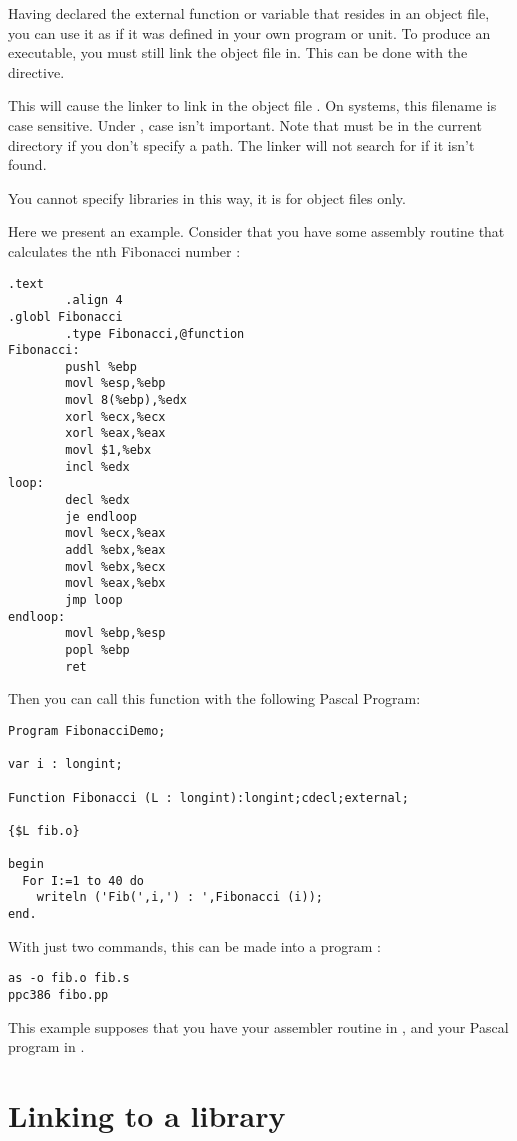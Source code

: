\documentclass{report}
\begin{document}
Having declared the external function or variable that resides in an object file,
you can use it as if it was defined in your own program or unit.
To produce an executable, you must still link the object file in.
This can be done with the  directive.

This will cause the linker to link in the object file . On
\linux systems, this filename is case sensitive. Under \dos, case isn't
important. Note that  must be in the current directory if you
don't specify a path. The linker will not search for  if it
isn't found.

You cannot specify libraries in this way, it is for object files only.

Here we present an example. Consider that you have some assembly routine that
calculates the nth Fibonacci number :
\begin{verbatim}
.text
        .align 4
.globl Fibonacci
        .type Fibonacci,@function
Fibonacci:
        pushl %ebp
        movl %esp,%ebp
        movl 8(%ebp),%edx
        xorl %ecx,%ecx
        xorl %eax,%eax
        movl $1,%ebx
        incl %edx
loop:
        decl %edx
        je endloop
        movl %ecx,%eax
        addl %ebx,%eax
        movl %ebx,%ecx
        movl %eax,%ebx
        jmp loop
endloop:
        movl %ebp,%esp
        popl %ebp
        ret
\end{verbatim}
Then you can call this function with the following Pascal Program:
\begin{verbatim}
Program FibonacciDemo;

var i : longint;

Function Fibonacci (L : longint):longint;cdecl;external;

{$L fib.o}

begin
  For I:=1 to 40 do
    writeln ('Fib(',i,') : ',Fibonacci (i));
end.
\end{verbatim}
With just two commands, this can be made into a program :
\begin{verbatim}
as -o fib.o fib.s
ppc386 fibo.pp
\end{verbatim}
This example supposes that you have your assembler routine in ,
and your Pascal program in .

\section{Linking to a library}
\label{se:LinkOut}
\end{document}
